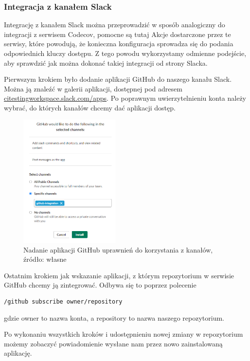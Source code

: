 \subsubsection{Integracja z kanałem Slack}
Integrację z kanałem Slack można przeprowadzić w sposób analogiczny do integracji z serwisem Codecov, pomocne są tutaj Akcje dostarczone przez te serwisy, które powodują, że konieczna konfiguracja sprowadza się do podania odpowiednich kluczy dostępu. Z tego powodu wykorzystamy odmienne podejście, aby sprawdzić jak można dokonać takiej integracji od strony Slacka. 

Pierwszym krokiem było dodanie aplikacji GitHub do naszego kanału Slack. Można ją znaleźć w galerii aplikacji, dostępnej pod adresem \url{citestingworkspace.slack.com/apps}. Po poprawnym uwierzytelnieniu konta należy wybrać, do których kanałów chcemy dać aplikacji dostęp. 

\begin{figure}[htbp]
    \centering
    \includegraphics[width=5cm]{images/testingCI7.png}
    \caption{Nadanie aplikacji GitHub uprawnień do korzystania z kanałów, źródło: własne}
    \label{fig:ci7}
\end{figure}
Ostatnim krokiem jak wskazanie aplikacji, z którym repozytorium w serwisie GitHub chcemy ją zintegrować. Odbywa się to poprzez polecenie 
\begin{lstlisting}[caption={Polecenie pozwalające połączyć aplikację GitHub z repozytorium}]
/github subscribe owner/repository
\end{lstlisting}

gdzie owner to nazwa konta, a repository to nazwa naszego repozytorium. 

Po wykonaniu wszystkich kroków i udostępnieniu nowej zmiany w repozytorium możemy zobaczyć powiadomienie wysłane nam przez nowo zainstalowaną aplikację. 

